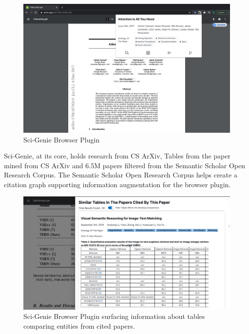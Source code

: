 \begin{figure}[h]
    \centering
    \includegraphics[width=\maxwidth{\textwidth}]{src/images/sci-genie-ext-exp.png}
    \caption{ Sci-Genie Browser Plugin}
    \label{figure\arabic{figurecounter}}
\end{figure}

Sci-Genie, at its core, holds research from CS ArXiv, Tables from the paper mined from CS ArXiv and 
6.5M papers filtered from the Semantic Scholar Open Research Corpus\parencite{ammar-etal-2018-construction}.
The Semantic Scholar Open Research Corpus helps create a citation graph supporting information augmentation for the browser plugin. 

\begin{figure}[h]
    \centering
    \includegraphics[width=\maxwidth{\textwidth}]{src/images/sci-genie-ext-table-comp-exp.pdf}
    \caption{Sci-Genie Browser Plugin surfacing information about tables comparing entities from cited papers.}
    \label{figure\arabic{figurecounter}}
\end{figure}


